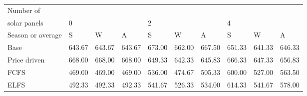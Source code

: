 \begin{table}[h] 
\centering 
\begin{tabular}{l|lll|lll|lll}Number of \\ solar panels&0& & &2& & &4& & \\ \hline 
Season or average & S & W & A & S & W & A & S & W & A \\ \hline 
Base&643.67&643.67&643.67&673.00&662.00&667.50&651.33&641.33&646.33 \\ 
Price driven&668.00&668.00&668.00&649.33&642.33&645.83&666.33&647.33&656.83 \\ 
FCFS&469.00&469.00&469.00&536.00&474.67&505.33&600.00&527.00&563.50 \\ 
ELFS&492.33&492.33&492.33&541.67&526.33&534.00&614.33&541.67&578.00 \\ 
\end{tabular} 
\end{table}
